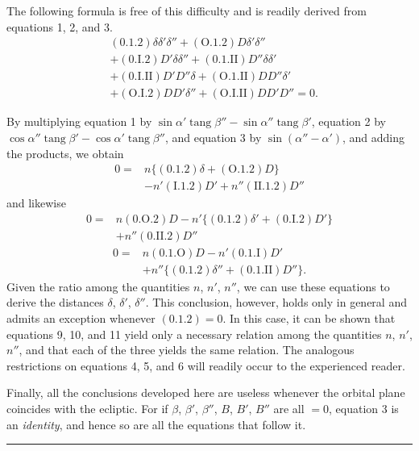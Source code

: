 \par
The following formula is free of this difficulty and is readily derived from equations 1, 2, and 3.
\[
\begin{aligned}
&(0.1.2)\delta\delta'\delta''+(\mathrm{O}.1.2)D\delta'\delta''\\
&+(0.\mathrm{I}.2)D'\delta\delta''+(0.1.\mathrm{II})D''\delta\delta'\\
&+(0.\mathrm{I}.\mathrm{II})D'D''\delta+(\mathrm{O}.1.\mathrm{II})DD''\delta'\\
&+(\mathrm{O}.\mathrm{I}.2)DD'\delta''+(\mathrm{O}.\mathrm{I}.\mathrm{II})DD'D''=0.
\end{aligned}\tag*{8)}
\]
\par
By multiplying equation 1 by $\sin\alpha'\operatorname{tang}\beta''-\sin\alpha''\operatorname{tang}\beta'$, equation 2 by $\cos\alpha''\operatorname{tang}\beta'-\cos\alpha'\operatorname{tang}\beta''$, and equation 3 by $\sin(\alpha''-\alpha')$, and adding the products, we obtain
\[
\begin{aligned}
0={}&n\{(0.1.2)\delta+(\mathrm{O}.1.2)D\}\\
&-n'(\mathrm{I}.1.2)D'+n''(\mathrm{II}.1.2)D''
\end{aligned}\tag*{9)}
\]
and likewise
\[
\begin{aligned}
0={}&n(0.\mathrm{O}.2)D-n'\{(0.1.2)\delta'+(0.\mathrm{I}.2)D'\}\\
&+n''(0.\mathrm{II}.2)D''
\end{aligned}\tag*{10)}
\]
\[
\begin{aligned}
0={}&n(0.1.\mathrm{O})D-n'(0.1.\mathrm{I})D'\\
&+n''\{(0.1.2)\delta''+(0.1.\mathrm{II})D''\}.
\end{aligned}\tag*{11)}
\]
Given the ratio among the quantities $n$, $n'$, $n''$, we can use these equations to derive the distances $\delta$, $\delta'$, $\delta''$. This conclusion, however, holds only in general and admits an exception whenever $(0.1.2)=0$. In this case, it can be shown that equations 9, 10, and 11 yield only a necessary relation among the quantities $n$, $n'$, $n''$, and that each of the three yields the same relation. The analogous restrictions on equations 4, 5, and 6 will readily occur to the experienced reader.
\par
Finally, all the conclusions developed here are useless whenever the orbital plane coincides with the ecliptic. For if $\beta$, $\beta'$, $\beta''$, $B$, $B'$, $B''$ are all $=0$, equation 3 is an \emph{identity}, and hence so are all the equations that follow it.
\par\bigskip\begin{center}\rule{.23\linewidth}{.35pt}\end{center}
